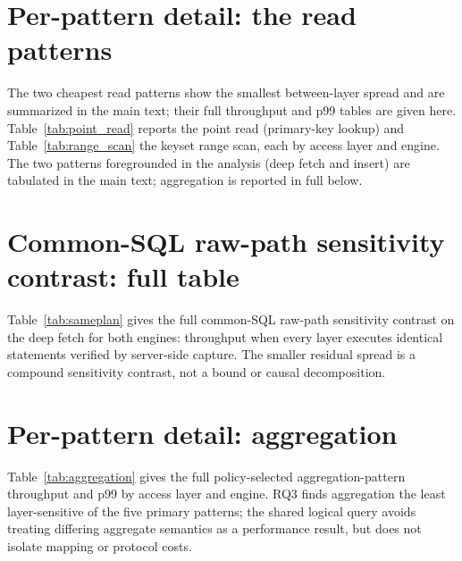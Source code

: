 \documentclass[11pt,a4paper]{article}
\newcommand{\tabledir}{tables/}
\begin{document}
\section{Per-pattern detail: the read patterns}
\label{sup:reads}
The two cheapest read patterns show the smallest between-layer spread and are
summarized in the main text; their full throughput and p99 tables are given here.
Table~\ref{tab:point_read} reports the point read (primary-key lookup) and
Table~\ref{tab:range_scan} the keyset range scan, each by access layer and engine.
The two patterns foregrounded in the analysis (deep fetch and insert) are tabulated
in the main text; aggregation is reported in full below.




\section{Common-SQL raw-path sensitivity contrast: full table}
\label{sup:sameplan}
Table~\ref{tab:sameplan} gives the full common-SQL raw-path sensitivity contrast on the deep fetch for both engines: throughput when every layer executes identical statements verified by server-side capture. The smaller residual spread is a compound sensitivity contrast, not a bound or causal decomposition.



\section{Per-pattern detail: aggregation}
\label{sup:aggregation}
Table~\ref{tab:aggregation} gives the full policy-selected aggregation-pattern throughput and p99 by access layer and engine. RQ3 finds aggregation the least layer-sensitive of the five primary patterns; the shared logical query avoids treating differing aggregate semantics as a performance result, but does not isolate mapping or protocol costs.


\end{document}
